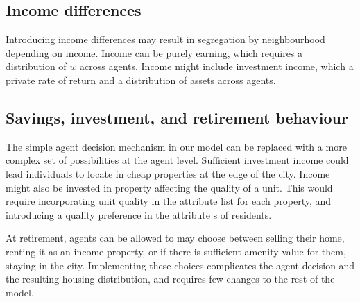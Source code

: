 \subsection{Income differences}

Introducing income differences may result in segregation by neighbourhood depending on income. Income can be purely earning, which requires a distribution of $w$ across agents. Income  might include investment income, which  a private rate of return and a distribution of assets across agents. 






\subsection{Savings, investment, and retirement behaviour}
The simple agent decision mechanism %
in our model can be replaced with a more complex set of possibilities at the agent level. Sufficient investment income could lead individuals to locate in cheap properties at the edge of the city.  Income might also be invested in property affecting the quality of a unit. This would require incorporating unit quality in the attribute list for each property, and introducing a quality preference  in the attribute s of residents.

At retirement,  agents can be allowed to may choose between selling their home, renting it as an income property, or if there is sufficient amenity value for them, staying in the city. Implementing these choices complicates the agent decision and the resulting housing distribution, and requires few changes to the rest of the model. 

